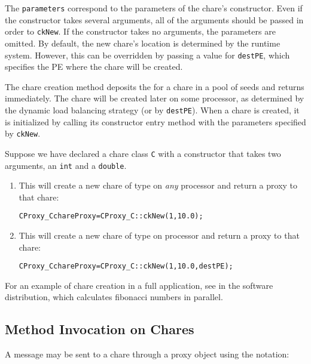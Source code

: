 The {\tt parameters} correspond to the parameters of the chare's constructor.
Even if the constructor takes several arguments, all of the arguments should be
passed in order to {\tt ckNew}. If the constructor takes no arguments, the
parameters are omitted. By default, the new chare's location is determined by
the runtime system. However, this can be overridden by passing a value for
{\tt destPE}, which specifies the PE where the chare will be created.

The chare creation method deposits the  for
a chare in a pool of seeds and returns immediately. The chare will
be created later on some processor, as determined by the dynamic load balancing strategy (or by {\tt destPE}).
When a chare is created, it is
initialized by calling its constructor entry method with the parameters specified by {\tt ckNew}.

Suppose we have declared a chare class {\tt C} with a constructor that takes two
arguments, an {\tt int} and a {\tt double}.

\begin{enumerate}
\item{This will create a new chare of type  on {\em any}
processor and return a proxy to that chare:}

\begin{alltt}
   CProxy_C chareProxy = CProxy_C::ckNew(1, 10.0);
\end{alltt} 

\item{This will create a new chare of type  on processor
 and return a proxy to that chare:}

\begin{alltt}
   CProxy_C chareProxy = CProxy_C::ckNew(1, 10.0, destPE);
\end{alltt}

\end{enumerate}

For an example of chare creation in a full application, see
 in the \charmpp software distribution, which
calculates fibonacci numbers in parallel.

\subsection{Method Invocation on Chares}

A message  may be sent to a chare through a proxy
object using the notation:

